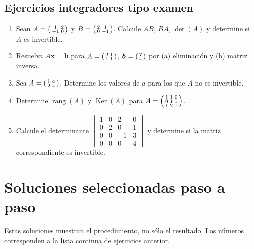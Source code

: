\documentclass[12pt]{article}
\theoremstyle{remark}
\newcommand{\rang}{\operatorname{rang}}
\newcommand{\Ker}{\operatorname{Ker}}
\newcommand{\vect}[1]{\boldsymbol{#1}}
\newcounter{contadorEjercicio}
\newenvironment{listaejercicios}{\begin{enumerate}[label=\textbf{E\arabic*.},leftmargin=2.4em,itemsep=0.52em]\setcounter{enumi}{\value{contadorEjercicio}}}{\setcounter{contadorEjercicio}{\value{enumi}}\end{enumerate}}
\begin{document}
\subsection{Ejercicios integradores tipo examen}
\begin{listaejercicios}
\item Sean $A=\begin{psmallmatrix}1&2\\-1&0\end{psmallmatrix}$ y $B=\begin{psmallmatrix}2&1\\0&-1\end{psmallmatrix}$. Calcule $AB$, $BA$, $\det(A)$ y determine si $A$ es invertible.
\item Resuelva $A\vect x=\vect b$ para $A=\begin{psmallmatrix}2&1\\1&1\end{psmallmatrix}$, $\vect b=\begin{psmallmatrix}7\\4\end{psmallmatrix}$ por (a) eliminación y (b) matriz inversa.
\item Sea $A=\begin{psmallmatrix}1&a\\2&4\end{psmallmatrix}$. Determine los valores de $a$ para los que $A$ no es invertible.
\item Determine $\rang(A)$ y $\Ker(A)$ para $A=\begin{psmallmatrix}1&1&0\\0&1&1\\1&2&1\end{psmallmatrix}$.
\item Calcule el determinante $\begin{vmatrix}1&0&2&0\\0&2&0&1\\0&0&-1&3\\0&0&0&4\end{vmatrix}$ y determine si la matriz correspondiente es invertible.
\end{listaejercicios}

\appendix
\section{Soluciones seleccionadas paso a paso}
Estas soluciones muestran el procedimiento, no sólo el resultado. Los números corresponden a la lista continua de ejercicios anterior.
\end{document}
